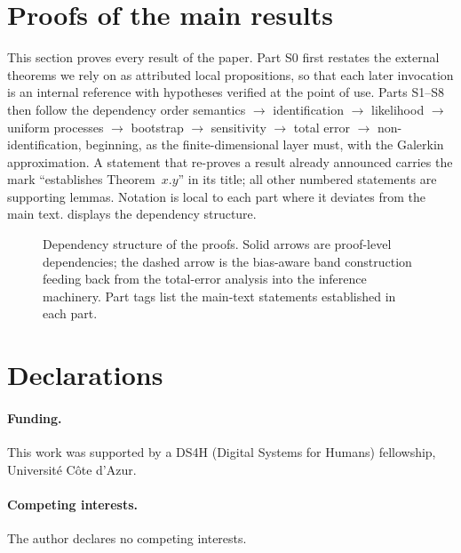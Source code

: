\documentclass[10pt]{article}
\theoremstyle{remark}
\providecommand{\1}{\mathbf 1}
\begin{document}
\clearpage
\section{Proofs of the main results}\label{sec:proofs}

This section proves every result of the paper. Part S0 first restates the
external theorems we rely on as attributed local propositions, so that each
later invocation is an internal reference with hypotheses verified at the
point of use. Parts S1--S8 then follow the dependency order
semantics $\to$ identification $\to$ likelihood $\to$ uniform processes
$\to$ bootstrap $\to$ sensitivity $\to$ total error $\to$
non-identification, beginning, as the finite-dimensional layer must, with
the Galerkin approximation. A statement that re-proves a result already
announced carries the mark ``establishes Theorem~$x.y$'' in its title; all
other numbered statements are supporting lemmas. Notation is local to each
part where it deviates from the main text.  displays
the dependency structure.

\begin{figure}[h]
\centering
\resizebox{.98\textwidth}{!}{}
\caption{Dependency structure of the proofs. Solid arrows are proof-level dependencies; the dashed arrow is the bias-aware band construction feeding back from the total-error analysis into the inference machinery. Part tags list the main-text statements established in each part.}
\label{fig:proofmap}
\end{figure}







\section*{Declarations}
\paragraph{Funding.} This work was supported by a DS4H (Digital Systems
for Humans) fellowship, Universit\'e C\^ote d'Azur.
\paragraph{Competing interests.} The author declares no competing interests.
\end{document}
